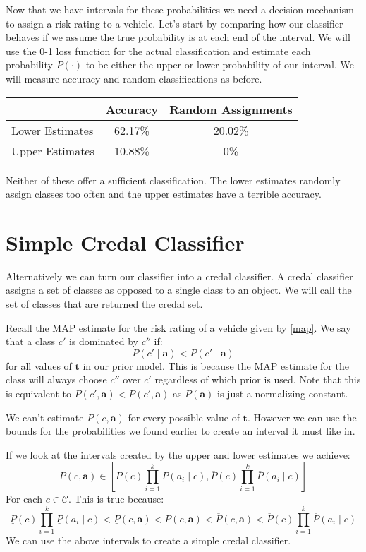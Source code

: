 Now that we have intervals for these probabilities we need a decision mechanism to assign a risk rating to a vehicle.
Let's start by comparing how our classifier behaves if we assume the true probability is at each end of the interval.
We will use the 0-1 loss function for the actual classification and estimate each probability $P(\cdot)$ to be either the upper or lower probability of our interval.
We will measure accuracy and random classifications as before.

\begin{center}
	\begin{tabular}{l|c c}
	                & Accuracy & Random Assignments \\
	\hline
	Lower Estimates & 62.17\%  & 20.02\%            \\
	Upper Estimates & 10.88\%  & 0\%                \\
	\end{tabular}
\end{center}

Neither of these offer a sufficient classification.
The lower estimates randomly assign classes too often and the upper estimates have a terrible accuracy.

\section{Simple Credal Classifier}
Alternatively we can turn our classifier into a credal classifier.
A credal classifier assigns a set of classes as opposed to a single class to an object.
We will call the set of classes that are returned the credal set.

Recall the MAP estimate for the risk rating of a vehicle given by \cref{map}.
We say that a class $c'$ is dominated by $c''$ if:
\begin{equation}\label{Credal Dominance}
P(c' \mid \mathbf{a}) < P(c' \mid \mathbf{a})
\end{equation}
for all values of $\mathbf{t}$ in our prior model.
This is because the MAP estimate for the class will always choose $c''$ over $c'$ regardless of which prior is used.
Note that this is equivalent to $P(c', \mathbf{a}) < P(c', \mathbf{a})$ as $P(\mathbf{a})$ is just a normalizing constant.

We can't estimate $P(c, \mathbf{a})$ for every possible value of $\mathbf{t}$.
However we can use the bounds for the probabilities we found earlier to create an interval it must like in. 

If we look at the intervals created by the upper and lower estimates we achieve:
\begin{equation}
	P(c, \mathbf{a}) \in \left[ \underline{P}(c)\prod_{i=1}^k \underline{P}(a_i \mid c), \overline{P}(c)\prod_{i=1}^k \overline{P}(a_i \mid c) \right]
\end{equation}
For each $c \in \mathcal{C}$.
This is true because:
\begin{equation}
\underline{P}(c)\prod_{i=1}^k \underline{P}(a_i \mid c) < \underline{P}(c, \mathbf{a}) < P(c, \mathbf{a}) < \overline{P}(c, \mathbf{a}) < \overline{P}(c)\prod_{i=1}^k \overline{P}(a_i \mid c)
\end{equation}
We can use the above intervals to create a simple credal classifier.


